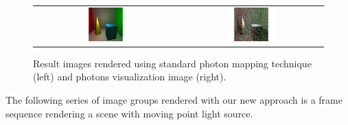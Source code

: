 \begin{figure}[htp]
\begin{center}
	\begin{tabular}{c | c}
		\includegraphics*[width=0.35\textwidth]{imgs/pq_ref.pdf} &
		\includegraphics*[width=0.35\textwidth]{imgs/pqv_ref.pdf}
	\end{tabular}
    \renewcommand{\thefigure}{\thechapter.\arabic{figure}}
    \caption[Rendered images and photons visualization with standard photon mapping technique]{Result images rendered using standard photon mapping technique (left) and photons visualization image (right).}
    \label{fig:pm_global}
\end{center}
\end{figure}

The following series of image groups rendered with our new approach is a frame sequence rendering a scene with moving point light source. %

